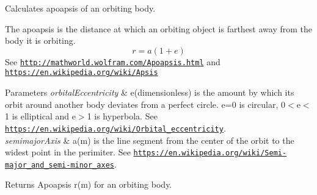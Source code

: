 Calculates apoapsis of an orbiting body. 

The apoapsis is the distance at which an orbiting object is farthest away from the body it is orbiting. \[r=a(1+e)\] See \href{http://mathworld.wolfram.com/Apoapsis.html}{\tt http\+://mathworld.\+wolfram.\+com/\+Apoapsis.\+html} and \href{https://en.wikipedia.org/wiki/Apsis}{\tt https\+://en.\+wikipedia.\+org/wiki/\+Apsis}


\begin{DoxyParams}{Parameters}
{\em orbital\+Eccentricity} & e(dimensionless) is the amount by which its orbit around another body deviates from a perfect circle. e=0 is circular, 0$<$e$<$1 is elliptical and e$>$1 is hyperbola. See \href{https://en.wikipedia.org/wiki/Orbital_eccentricity}{\tt https\+://en.\+wikipedia.\+org/wiki/\+Orbital\+\_\+eccentricity}. \\
\hline
{\em semimajor\+Axis} & a(m) is the line segment from the center of the orbit to the widest point in the perimiter. See \href{https://en.wikipedia.org/wiki/Semi-major_and_semi-minor_axes}{\tt https\+://en.\+wikipedia.\+org/wiki/\+Semi-\/major\+\_\+and\+\_\+semi-\/minor\+\_\+axes}. \\
\hline
\end{DoxyParams}
\begin{DoxyReturn}{Returns}
Apoapsis r(m) for an orbiting body. 
\end{DoxyReturn}
